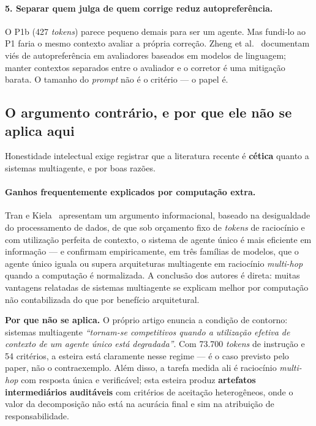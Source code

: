 \documentclass[11pt,a4paper]{article}
\begin{document}
\paragraph{5. Separar quem julga de quem corrige reduz autopreferência.}
O P1b (427 \textit{tokens}) parece pequeno demais para ser um agente. Mas fundi-lo ao P1 faria o mesmo
contexto avaliar a própria correção. Zheng et al.~\cite{zheng2023} documentam viés de autopreferência em
avaliadores baseados em modelos de linguagem; manter contextos separados entre o avaliador e o corretor é
uma mitigação barata. O tamanho do \textit{prompt} não é o critério --- o papel é.

\subsection{O argumento contrário, e por que ele não se aplica aqui}

Honestidade intelectual exige registrar que a literatura recente é \textbf{cética} quanto a sistemas
multiagente, e por boas razões.

\paragraph{Ganhos frequentemente explicados por computação extra.}
Tran e Kiela~\cite{tran2026} apresentam um argumento informacional, baseado na desigualdade do processamento
de dados, de que sob orçamento fixo de \textit{tokens} de raciocínio e com utilização perfeita de contexto, o
sistema de agente único é mais eficiente em informação --- e confirmam empiricamente, em três famílias de
modelos, que o agente único iguala ou supera arquiteturas multiagente em raciocínio \textit{multi-hop} quando
a computação é normalizada. A conclusão dos autores é direta: muitas vantagens relatadas de sistemas
multiagente se explicam melhor por computação não contabilizada do que por benefício arquitetural.

\textbf{Por que não se aplica.} O próprio artigo enuncia a condição de contorno: sistemas multiagente
\textit{``tornam-se competitivos quando a utilização efetiva de contexto de um agente único está
degradada''}. Com 73.700 \textit{tokens} de instrução e 54 critérios, a esteira está claramente nesse regime
--- é o caso previsto pelo paper, não o contraexemplo. Além disso, a tarefa medida ali é raciocínio
\textit{multi-hop} com resposta única e verificável; esta esteira produz \textbf{artefatos intermediários
auditáveis} com critérios de aceitação heterogêneos, onde o valor da decomposição não está na acurácia final
e sim na atribuição de responsabilidade.
\end{document}
